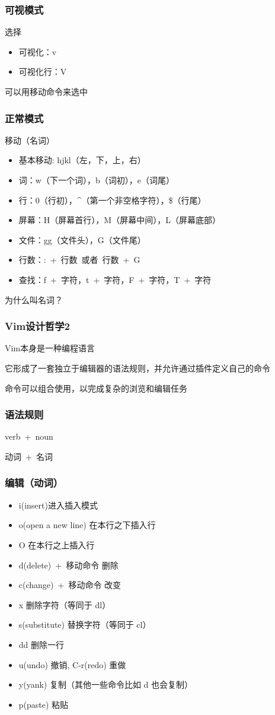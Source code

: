 \documentclass[UTF8, 16pt]{beamer}
\begin{document}
\begin{frame}
    \frametitle{可视模式}
    \textcolor{sufered}{选择}
    \begin{itemize}
        \item 可视化：v
        \item 可视化行：V
    \end{itemize}
    可以用移动命令来选中
\end{frame}

\begin{frame}
    \frametitle{正常模式}
    \textcolor{sufered}{移动（名词）}
    \begin{itemize}
        \item 基本移动: hjkl（左，下，上，右）
        \item 词：w（下一个词），b（词初），e（词尾）
        \item 行：0（行初），\^{}（第一个非空格字符），\$（行尾）
        \item 屏幕：H（屏幕首行），M（屏幕中间），L（屏幕底部）
        \item 文件：gg（文件头），G（文件尾）
        \item 行数：:\ +\ 行数\ 或者\ 行数\ +\ G
        \item 查找：f\ +\ 字符，t\ +\ 字符，F\ +\ 字符，T\ +\ 字符
    \end{itemize}
    为什么叫名词？
\end{frame}

\begin{frame}
    \frametitle{Vim设计哲学2}
    \textcolor{sufered}{Vim本身是一种编程语言}

    它形成了一套独立于编辑器的语法规则，并允许通过插件定义自己的命令

    命令可以组合使用，以完成复杂的浏览和编辑任务
\end{frame}

\begin{frame}
    \frametitle{语法规则}
    \textcolor{sufered}{verb\ +\ noun}

    动词\ +\ 名词
\end{frame}

\begin{frame}
    \frametitle{编辑（动词）}
    \begin{itemize}
        \item i(insert)进入插入模式
        \item o(open a new line) 在本行之下插入行
        \item O 在本行之上插入行
        \item d(delete)\ +\ 移动命令 删除
        \item c(change)\ +\ 移动命令 改变
        \item x 删除字符（等同于 dl）
        \item s(substitute) 替换字符（等同于 cl）
        \item dd 删除一行
        \item u(undo) 撤销, C-r(redo) 重做
        \item y(yank) 复制（其他一些命令比如 d 也会复制）
        \item p(paste) 粘贴
    \end{itemize}
\end{frame}
\end{document}
